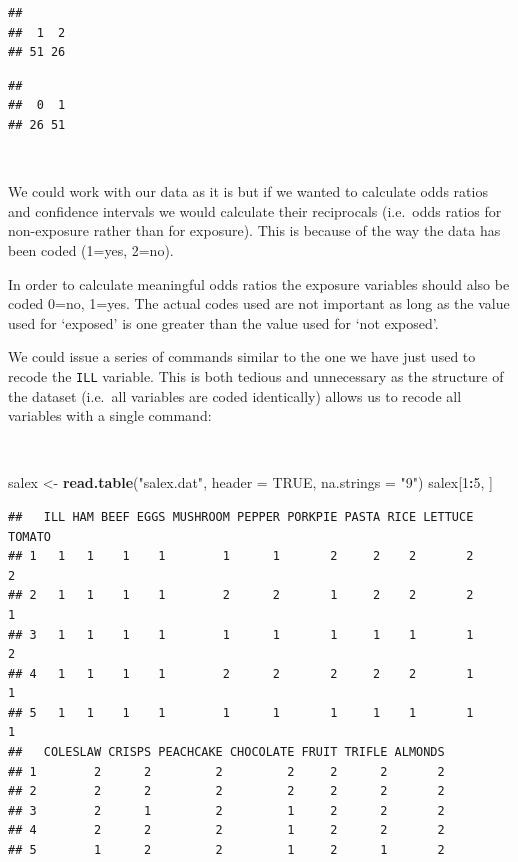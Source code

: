 \documentclass[12pt,a4paper]{book}
\newenvironment{Shaded}{\begin{snugshade}}{\end{snugshade}}
\newcommand{\KeywordTok}[1]{\textcolor[rgb]{0.13,0.29,0.53}{\textbf{#1}}}
\newcommand{\DataTypeTok}[1]{\textcolor[rgb]{0.13,0.29,0.53}{#1}}
\newcommand{\DecValTok}[1]{\textcolor[rgb]{0.00,0.00,0.81}{#1}}
\newcommand{\StringTok}[1]{\textcolor[rgb]{0.31,0.60,0.02}{#1}}
\newcommand{\OtherTok}[1]{\textcolor[rgb]{0.56,0.35,0.01}{#1}}
\newcommand{\OperatorTok}[1]{\textcolor[rgb]{0.81,0.36,0.00}{\textbf{#1}}}
\newcommand{\NormalTok}[1]{#1}
\theoremstyle{definition}
\theoremstyle{definition}
\theoremstyle{definition}
\theoremstyle{remark}
\begin{document}
\begin{verbatim}
## 
##  1  2 
## 51 26
\end{verbatim}

\begin{verbatim}
## 
##  0  1 
## 26 51
\end{verbatim}

~

We could work with our data as it is but if we wanted to calculate odds
ratios and confidence intervals we would calculate their reciprocals
(i.e.~odds ratios for non-exposure rather than for exposure). This is
because of the way the data has been coded (1=yes, 2=no).

In order to calculate meaningful odds ratios the exposure variables
should also be coded 0=no, 1=yes. The actual codes used are not
important as long as the value used for `exposed' is one greater than
the value used for `not exposed'.

We could issue a series of commands similar to the one we have just used
to recode the \texttt{ILL} variable. This is both tedious and
unnecessary as the structure of the dataset (i.e.~all variables are
coded identically) allows us to recode all variables with a single
command:

~

\begin{Shaded}
\begin{Highlighting}[]
\NormalTok{salex <-}\StringTok{ }\KeywordTok{read.table}\NormalTok{(}\StringTok{"salex.dat"}\NormalTok{, }\DataTypeTok{header =} \OtherTok{TRUE}\NormalTok{, }\DataTypeTok{na.strings =} \StringTok{"9"}\NormalTok{)}
\NormalTok{salex[}\DecValTok{1}\OperatorTok{:}\DecValTok{5}\NormalTok{, ]}
\end{Highlighting}
\end{Shaded}

\begin{verbatim}
##   ILL HAM BEEF EGGS MUSHROOM PEPPER PORKPIE PASTA RICE LETTUCE TOMATO
## 1   1   1    1    1        1      1       2     2    2       2      2
## 2   1   1    1    1        2      2       1     2    2       2      1
## 3   1   1    1    1        1      1       1     1    1       1      2
## 4   1   1    1    1        2      2       2     2    2       1      1
## 5   1   1    1    1        1      1       1     1    1       1      1
##   COLESLAW CRISPS PEACHCAKE CHOCOLATE FRUIT TRIFLE ALMONDS
## 1        2      2         2         2     2      2       2
## 2        2      2         2         2     2      2       2
## 3        2      1         2         1     2      2       2
## 4        2      2         2         1     2      2       2
## 5        1      2         2         1     2      1       2
\end{verbatim}
\end{document}

